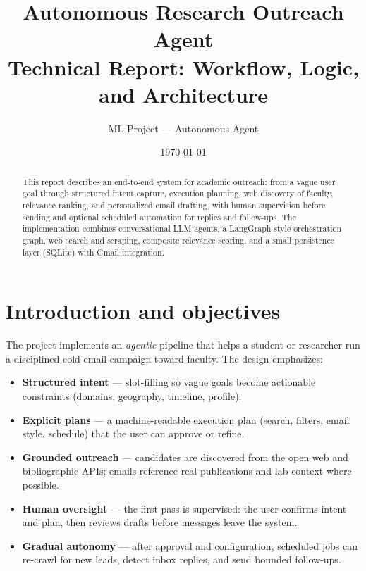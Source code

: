\documentclass[11pt,a4paper]{article}
\title{\textbf{Autonomous Research Outreach Agent}\\[0.35em]
\large Technical Report: Workflow, Logic, and Architecture}
\author{ML Project --- Autonomous Agent}
\date{\today}
\begin{document}
\maketitle

\begin{abstract}
This report describes an end-to-end system for academic outreach: from a vague user goal through structured intent capture, execution planning, web discovery of faculty, relevance ranking, and personalized email drafting, with human supervision before sending and optional scheduled automation for replies and follow-ups. The implementation combines conversational LLM agents, a LangGraph-style orchestration graph, web search and scraping, composite relevance scoring, and a small persistence layer (SQLite) with Gmail integration.
\end{abstract}

\tableofcontents
\newpage

\section{Introduction and objectives}

The project implements an \emph{agentic} pipeline that helps a student or researcher run a disciplined cold-email campaign toward faculty. The design emphasizes:
\begin{itemize}[noitemsep]
  \item \textbf{Structured intent} --- slot-filling so vague goals become actionable constraints (domains, geography, timeline, profile).
  \item \textbf{Explicit plans} --- a machine-readable execution plan (search, filters, email style, schedule) that the user can approve or refine.
  \item \textbf{Grounded outreach} --- candidates are discovered from the open web and bibliographic APIs; emails reference real publications and lab context where possible.
  \item \textbf{Human oversight} --- the first pass is supervised: the user confirms intent and plan, then reviews drafts before messages leave the system.
  \item \textbf{Gradual autonomy} --- after approval and configuration, scheduled jobs can re-crawl for new leads, detect inbox replies, and send bounded follow-ups.
\end{itemize}

\end{document}
